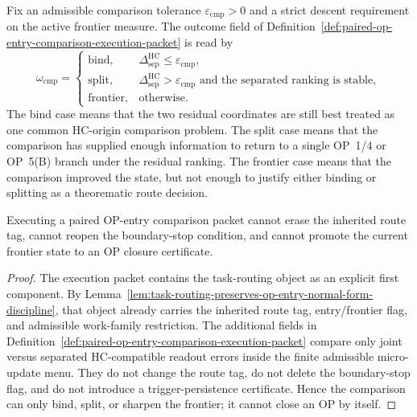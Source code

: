 \begin{definition}
\label{def:hc-origin-comparison-decision-rule}
Fix an admissible comparison tolerance $\varepsilon_{\mathrm{cmp}}>0$ and a strict descent requirement on the active frontier measure.  The outcome field of Definition~\ref{def:paired-op-entry-comparison-execution-packet} is read by
\[
  \omega_{\mathrm{cmp}}
  =
  \begin{cases}
    \mathrm{bind},
      & \Delta_{\mathrm{sep}}^{\mathrm{HC}}\leq \varepsilon_{\mathrm{cmp}},\\[0.25em]
    \mathrm{split},
      & \Delta_{\mathrm{sep}}^{\mathrm{HC}}>\varepsilon_{\mathrm{cmp}}
        \text{ and the separated ranking is stable},\\[0.25em]
    \mathrm{frontier},
      & \text{otherwise.}
  \end{cases}
\]
The bind case means that the two residual coordinates are still best treated as one common HC-origin comparison problem.  The split case means that the comparison has supplied enough information to return to a single OP~1/4 or OP~5(B) branch under the residual ranking.  The frontier case means that the comparison improved the state, but not enough to justify either binding or splitting as a theorematic route decision.
\end{definition}

\begin{lemma}
\label{lem:paired-comparison-execution-preserves-handoff-discipline}
Executing a paired OP-entry comparison packet cannot erase the inherited route tag, cannot reopen the boundary-stop condition, and cannot promote the current frontier state to an OP closure certificate.
\end{lemma}

\begin{proof}
The execution packet contains the task-routing object as an explicit first component.  By Lemma~\ref{lem:task-routing-preserves-op-entry-normal-form-discipline}, that object already carries the inherited route tag, entry/frontier flag, and admissible work-family restriction.  The additional fields in Definition~\ref{def:paired-op-entry-comparison-execution-packet} compare only joint versus separated HC-compatible readout errors inside the finite admissible micro-update menu.  They do not change the route tag, do not delete the boundary-stop flag, and do not introduce a trigger-persistence certificate.  Hence the comparison can only bind, split, or sharpen the frontier; it cannot close an OP by itself.
\end{proof}

